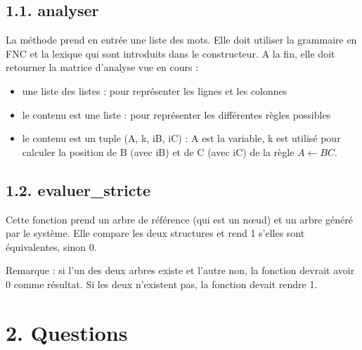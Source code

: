 \documentclass[11pt, a4paper]{article}
\begin{document}
\subsection*{1.1. analyser}

La méthode prend en entrée une liste des mots.
Elle doit utiliser la grammaire en FNC et la lexique qui sont introduits dans le constructeur.
A la fin, elle doit retourner la matrice d'analyse vue en cours : 
\begin{itemize}
	\item une liste des listes : pour représenter les lignes et les colonnes
	\item le contenu est une liste : pour représenter les différentes règles possibles
	\item le contenu est un tuple (A, k, iB, iC) : A est la variable, k est utilisé pour calculer la position de B (avec iB) et de C (avec iC) de la règle $A \leftarrow B C$.
\end{itemize}

\subsection*{1.2. evaluer\_stricte}

Cette fonction prend un arbre de référence (qui est un nœud) et un arbre généré par le système.
Elle compare les deux structures et rend 1 s'elles sont équivalentes, sinon 0.

Remarque : si l'un des deux arbres existe et l'autre non, la fonction devrait avoir 0 comme résultat.
Si les deux n'existent pas, la fonction devait rendre 1.

%
%
%
%
%
%
\section*{2. Questions}
\end{document}
